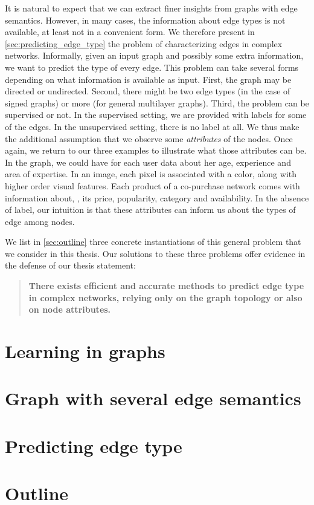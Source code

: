 \medskip

It is natural to expect that we can extract finer insights from graphs with edge semantics. However,
in many cases, the information about edge types is not available, at least not in a convenient form.
We therefore present in
\autoref{sec:predicting_edge_type} the problem of characterizing edges in complex networks.
Informally, given an input graph and possibly some extra information, we want to predict the type of
every edge. This problem can take several forms depending on what information is available as input.
First, the graph may be directed or undirected. Second, there might be two edge types (in the case of
signed graphs) or more (for general multilayer graphs). Third, the problem can be supervised or not.
In the supervised setting, we are provided with labels for some of the edges. In the unsupervised
setting, there is no label at all. We thus make the additional assumption that we observe some
\emph{attributes} of the nodes. Once again, we return to our three examples to illustrate what
those attributes can be. In the \wik{} graph, we could have for each user data about her age, experience and
area of expertise. In an image, each pixel is associated with a color, along with higher order
visual features. Each product of a co-purchase network comes with information about, \eg{}, its price,
popularity, category and availability. In the absence of label, our intuition is that these
attributes can inform us about the types of edge among nodes. 

\medskip

We list in \autoref{sec:outline} three concrete instantiations of this general problem that we
consider in this thesis. Our solutions to these three problems offer evidence in the defense of our
thesis statement:
\begin{quote}
\bf
There exists efficient and accurate methods to predict edge type in complex networks, relying
only on the graph topology or also on node attributes.
\end{quote}

\section{Learning in graphs}
\label{sec:learning_in_graphs}


\section{Graph with several edge semantics}
\label{sec:edge_semantics}


\section{Predicting edge type}
\label{sec:predicting_edge_type}


\section{Outline}
\label{sec:outline}

